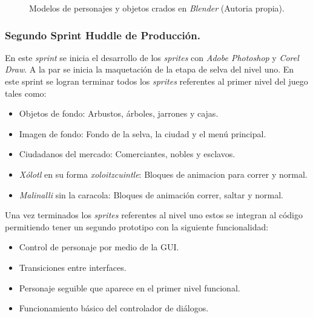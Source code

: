 \begin{figure}[h]
  		\centering
   
 	
		
		
  		\caption{Modelos de personajes y objetos crados en \textit{Blender} (Autoria propia).}
  		\label{fig:Modelos3D}
\end{figure}

\subsubsection{Segundo Sprint Huddle de Producción.}
En este \textit{sprint} se inicia el desarrollo de los \textit{sprites} 
con \textit{Adobe Photoshop} y \textit{Corel Draw}. A la par se inicia la 
maquetación de la etapa de selva del nivel uno. En este sprint se logran 
terminar todos los \textit{sprites} referentes al primer nivel del juego 
tales como: 

\begin{itemize}
        \item Objetos de fondo: Arbustos, árboles, jarrones y cajas. 
        \item Imagen de fondo: Fondo de la selva, la ciudad y el menú principal. 
        \item Ciudadanos del mercado: Comerciantes, nobles y esclavos. 
        \item \textit{Xólotl} en su forma \textit{xoloitzcuintle}: Bloques de 
        animacion para correr y normal.
        \item \textit{Malinalli} sin la caracola: Bloques de animación correr, 
        saltar y normal.
\end{itemize}
Una vez terminados los \textit{sprites} referentes al nivel uno estos se integran al código 
permitiendo tener un segundo prototipo con la siguiente funcionalidad:
\begin{itemize}
        \item Control de personaje por medio de la GUI.
        \item Transiciones entre interfaces.
        \item Personaje seguible que aparece en el primer nivel funcional.
        \item Funcionamiento básico del controlador de diálogos.
\end{itemize}
